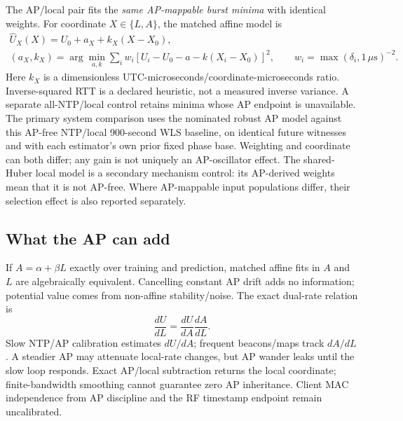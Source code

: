 \documentclass[10pt,letterpaper]{article}
\newcommand{\us}{\ensuremath{\,\mu\mathrm{s}}}
\begin{document}
The AP/local pair fits the \emph{same AP-mappable burst minima} with identical
weights. For coordinate $X\in\{L,A\}$, the matched affine model is
\begin{equation}
 \begin{gathered}
 \widehat U_X(X)=U_0+a_X+k_X(X-X_0),\\
 (a_X,k_X)=\arg\min_{a,k}\sum_i w_i[U_i-U_0-a-k(X_i-X_0)]^2,
 \qquad w_i=\max(\delta_i,1\us)^{-2}.
 \end{gathered}
\end{equation}
Here $k_X$ is a dimensionless UTC-microseconds/coordinate-microseconds ratio.
Inverse-squared RTT is a declared heuristic, not a measured inverse variance.
A separate all-NTP/local control retains minima whose AP endpoint is unavailable.
The primary system comparison uses the nominated robust AP model against this
AP-free NTP/local 900-second WLS baseline, on identical future witnesses and
with each estimator's own prior fixed phase base. Weighting and coordinate can
both differ; any gain is not uniquely an AP-oscillator effect. The shared-Huber
local model is a secondary mechanism control: its AP-derived weights mean that
it is not AP-free. Where AP-mappable input populations differ, their selection
effect is also reported separately.

\subsection{What the AP can add}
If $A=\alpha+\beta L$ exactly over training and prediction, matched affine
fits in $A$ and $L$ are algebraically equivalent. Cancelling constant AP drift
adds no information; potential value comes from non-affine stability/noise.
The exact dual-rate relation is
\begin{equation}
 \frac{dU}{dL}=\frac{dU}{dA}\frac{dA}{dL}.
\end{equation}
Slow NTP/AP calibration estimates $dU/dA$; frequent beacons/maps track $dA/dL$.
A steadier AP may attenuate local-rate changes, but AP wander leaks until the
slow loop responds. Exact AP/local subtraction returns the local coordinate;
finite-bandwidth smoothing cannot guarantee zero AP inheritance. Client MAC
independence from AP discipline and the RF timestamp endpoint remain uncalibrated.
\end{document}
